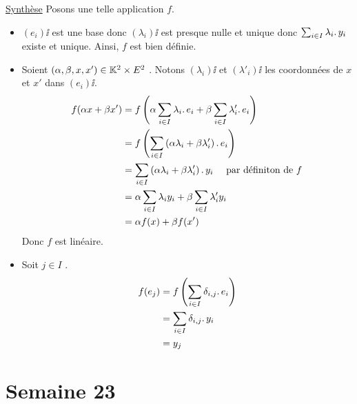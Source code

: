\documentclass{article}
\renewenvironment{question_kholle}[2][ ]
{
	\subsection{\texorpdfstring{#2}{}}
	\notblank{#1}
	{
		\noindent #1
		\bigbreak
	}
	{}
	\begin{proof}
}
{
	\end{proof}
}
\begin{document}
\begin{question_kholle}
  \noindent \underline{Synthèse} Posons une telle application $f$. \\
  \begin{itemize}
    \item $(e_i)\ii$ est une base donc $(\lambda_i)\ii$ est presque nulle et unique donc $\sum_{i \in I} \lambda_i \ldotp y_i$ existe et unique.
          Ainsi, $f$ est bien définie.
    \item Soient $(\alpha, \beta, x, x') \in \mathbb K^2 \times E^2$ \fqs. Notons $(\lambda_i)\ii$ et $(\lambda'_i)\ii$ les coordonnées de $x$ et $x'$ dans $(e_i)\ii$.
          \begin{equation*}
            \begin{aligned}
              f( \alpha x + \beta x' )
               & = f\left( \alpha \sum_{i \in I} \lambda_i \ldotp e_i + \beta \sum_{i \in I} \lambda'_i \ldotp e_i \right)               \\
               & = f\left( \sum_{i \in I} \left( \alpha \lambda_i + \beta \lambda'_i \right) \ldotp e_i \right)                   \\
               & = \sum_{i \in I} \left( \alpha \lambda_i + \beta \lambda'_i \right) \ldotp y_i \quad \text{ par définiton de } f \\
               & = \alpha \sum_{i \in I} \lambda_i y_i + \beta \sum_{i \in I} \lambda'_i y_i                                             \\
               & = \alpha f(x) + \beta f(x')
            \end{aligned}
          \end{equation*}
          Donc $f$ est linéaire.
    \item Soit $j \in I$ \fq.
          \begin{equation*}
            \begin{aligned}
              f(e_j)
               & = f \left(\sum_{i \in I} \delta_{i,j} \ldotp e_i \right) \\
               & = \sum_{i \in I} \delta_{i,j} \ldotp y_i                 \\
               & = y_j
            \end{aligned}
          \end{equation*}
  \end{itemize}
\end{question_kholle}

\pagebreak\section{Semaine 23}
\end{document}
